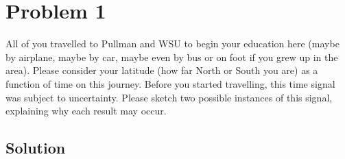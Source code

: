 \section{Problem 1}
 
 All of you travelled to Pullman and WSU to begin your education here (maybe by airplane, maybe by car, maybe even by bus or on foot if you grew up in the area). Please consider your latitude (how far North or South you are) as a function of time on this journey. Before you started travelling, this time signal was subject to uncertainty. Please sketch two possible instances of this signal, explaining why each result may occur.
 
\subsection{Solution}
